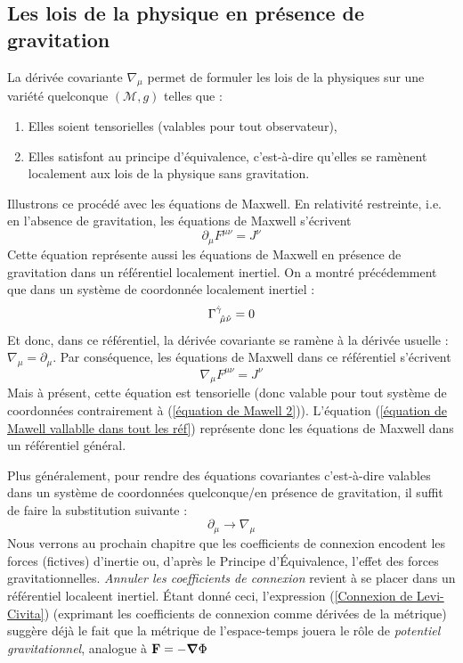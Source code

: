 \subsection{Les lois de la physique en présence de gravitation}
La dérivée covariante $\nabla_{\mu}$ permet de formuler les lois de la physiques sur une variété quelconque $(\mathcal{M}, g)$ telles que :
\begin{enumerate}
    \item Elles soient tensorielles (valables pour tout observateur),
    \item Elles satisfont au principe d'équivalence, c'est-à-dire qu'elles se ramènent localement aux lois de la physique sans gravitation.
\end{enumerate}
Illustrons ce procédé avec les équations de Maxwell. En relativité restreinte, i.e. en l'absence de gravitation, les équations de Maxwell s'écrivent
\begin{equation}
    \partial_{\mu}F^{\mu \nu} = J^{\nu}
\label{équation de Mawell 2}
\end{equation}
Cette équation représente aussi les équations de Maxwell en présence de gravitation dans un référentiel localement inertiel. On a montré précédemment que dans un système de coordonnée localement inertiel :
\begin{equation}
    \Gamma\indices{^{\hat{\gamma}}_{\!\hat{\mu} \hat{\nu}}} = 0
\end{equation}
 Et donc, dans ce référentiel, la dérivée covariante se ramène à la dérivée usuelle : $\nabla_{\mu} = \partial_{\mu}$. Par conséquence, les équations de Maxwell dans ce référentiel s'écrivent
 \begin{equation}
     \nabla_{\mu} F^{\mu \nu} = J^{\nu}
     \label{équation de Mawell vallablle dans tout les réf}
 \end{equation}
 Mais à présent, cette équation est tensorielle (donc valable pour tout système de coordonnées contrairement à (\ref{équation de Mawell 2})). L'équation (\ref{équation de Mawell vallablle dans tout les réf}) représente donc les équations de Maxwell dans un référentiel général. 

 Plus généralement, pour rendre des équations covariantes c'est-à-dire valables dans un système de coordonnées quelconque/en présence de gravitation, il suffit de faire la substitution suivante :
 \begin{equation}
     \partial_{\mu} \rightarrow \nabla_{\mu}
 \end{equation}
Nous verrons au prochain chapitre que les coefficients de connexion encodent les forces (fictives) d'inertie ou, d'après le Principe d'Équivalence, l'effet des forces gravitationnelles. \emph{Annuler les coefficients de connexion} revient à se placer dans un référentiel localeent inertiel. Étant donné ceci, l'expression (\ref{Connexion de Levi-Civita}) (exprimant les coefficients de connexion comme dérivées de la métrique) suggère déjà le fait que la métrique de l'espace-temps jouera le rôle de \emph{potentiel gravitationnel}, analogue à $\bm{\mathrm{F}} = - \bm{\mathrm{\nabla}} \Phi$


